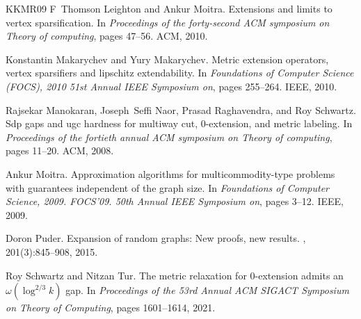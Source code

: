 \documentclass[11pt]{article}
\theoremstyle{definition}
\begin{document}
\begin{thebibliography}{KKMR09}
F~Thomson Leighton and Ankur Moitra.
\newblock Extensions and limits to vertex sparsification.
\newblock In {\em Proceedings of the forty-second ACM symposium on Theory of
  computing}, pages 47--56. ACM, 2010.

Konstantin Makarychev and Yury Makarychev.
\newblock Metric extension operators, vertex sparsifiers and lipschitz
  extendability.
\newblock In {\em Foundations of Computer Science (FOCS), 2010 51st Annual IEEE
  Symposium on}, pages 255--264. IEEE, 2010.

Rajsekar Manokaran, Joseph~Seffi Naor, Prasad Raghavendra, and Roy Schwartz.
\newblock Sdp gaps and ugc hardness for multiway cut, 0-extension, and metric
  labeling.
\newblock In {\em Proceedings of the fortieth annual ACM symposium on Theory of
  computing}, pages 11--20. ACM, 2008.

Ankur Moitra.
\newblock Approximation algorithms for multicommodity-type problems with
  guarantees independent of the graph size.
\newblock In {\em Foundations of Computer Science, 2009. FOCS'09. 50th Annual
  IEEE Symposium on}, pages 3--12. IEEE, 2009.

Doron Puder.
\newblock Expansion of random graphs: New proofs, new results.
, 201(3):845--908, 2015.

Roy Schwartz and Nitzan Tur.
\newblock The metric relaxation for 0-extension admits an $\omega(\log^{2/3}k)$
  gap.
\newblock In {\em Proceedings of the 53rd Annual ACM SIGACT Symposium on Theory
  of Computing}, pages 1601--1614, 2021.

\end{thebibliography}
\end{document}
